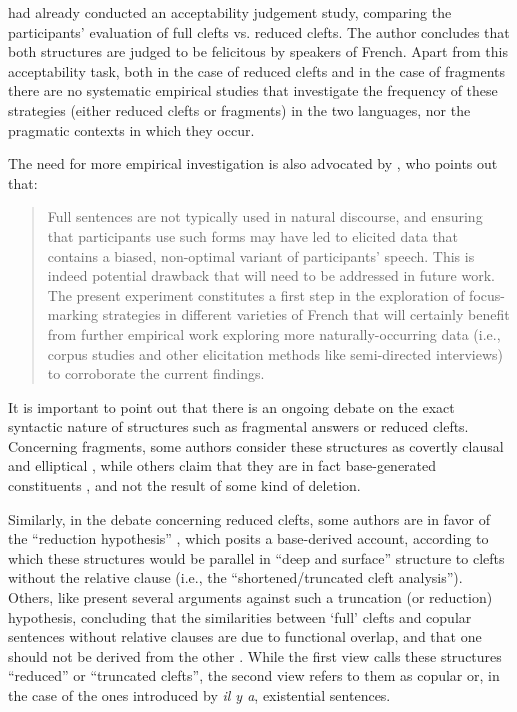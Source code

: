 \textcite{katz2000categories} had already conducted an acceptability judgement study, comparing the participants' evaluation of full clefts vs. reduced clefts. The author concludes that both structures are judged to be felicitous by speakers of French. Apart from this acceptability task, both in the case of reduced clefts and in the case of fragments  there are no systematic empirical studies that investigate the frequency of these strategies (either reduced clefts or fragments) in the two languages, nor the pragmatic contexts in which they occur.

The need for more empirical investigation is also advocated by \textcite{destruel2016focus}, who points out that: 

\begin{quote}
Full sentences are not typically used in natural discourse, and ensuring that participants use such forms may have led to elicited data that contains a biased, non-optimal variant of participants' speech. This is indeed potential drawback that will need to be addressed in future work. The present experiment constitutes a first step in the exploration of focus-marking strategies in different varieties of French that will certainly benefit from further empirical work exploring more naturally-occurring data (i.e., corpus studies and other elicitation methods like semi-directed interviews) to corroborate the current findings. 
\parencite[309]{destruel2016focus}
\end{quote}


It is important to point out that there is an ongoing debate on the exact syntactic nature of structures such as fragmental answers or reduced clefts. 
Concerning fragments, some  authors  consider these structures as covertly clausal and elliptical \parencite{merchant2005fragments}, while others claim that they are in fact base-generated constituents \parencite{stainton1998quantifier, jonathan2000interrogative, jacobson2016short}, and not the result of some kind of deletion.

Similarly, in the debate concerning reduced clefts, some authors are in favor of the “reduction hypothesis” \parencite{jenkins2017cleft}, which posits a base-derived account, according to which these structures would be parallel in “deep and surface” structure to clefts without the relative clause (i.e., the ``shortened/truncated cleft analysis”). Others, like \textcite{milsark2014existential, birner2007functional} present several arguments against such a truncation (or reduction) hypothesis, concluding that the similarities between ‘full’ clefts and copular sentences without relative clauses are due to functional overlap, and that one should not be derived from the other \parencite[319]{birner2007functional}. While the first view calls these structures ``reduced” or ``truncated clefts”, the second view refers to them as copular or, in the case of the ones introduced by \textit{il y a}, existential sentences.

